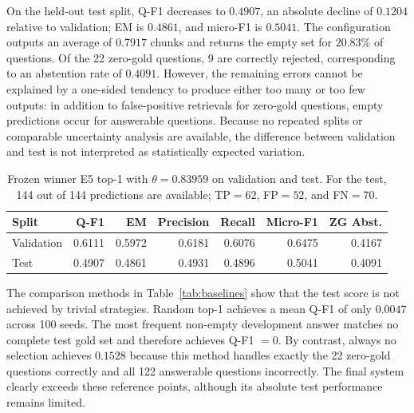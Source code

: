 \documentclass[11pt]{article}
\begin{document}
On the held-out test split, Q-F1 decreases to $0.4907$, an absolute decline of $0.1204$ relative to validation; EM is $0.4861$, and micro-F1 is $0.5041$. The configuration outputs an average of $0.7917$ chunks and returns the empty set for $20.83\%$ of questions. Of the 22 zero-gold questions, 9 are correctly rejected, corresponding to an abstention rate of $0.4091$. However, the remaining errors cannot be explained by a one-sided tendency to produce either too many or too few outputs: in addition to false-positive retrievals for zero-gold questions, empty predictions occur for answerable questions. Because no repeated splits or comparable uncertainty analysis are available, the difference between validation and test is not interpreted as statistically expected variation.

\begin{table}[t]
\centering
\small
\begin{tabular}{lrrrrrr}
\toprule
\textbf{Split} & \textbf{Q-F1} & \textbf{EM} & \textbf{Precision} & \textbf{Recall} & \textbf{Micro-F1} & \textbf{ZG Abst.} \\
\midrule
Validation & 0.6111 & 0.5972 & 0.6181 & 0.6076 & 0.6475 & 0.4167 \\
Test         & 0.4907 & 0.4861 & 0.4931 & 0.4896 & 0.5041 & 0.4091 \\
\bottomrule
\end{tabular}
\caption{Frozen winner E5 top-1 with $\theta=0.83959$ on validation and test. For the test, 144 out of 144 predictions are available; TP${}=62$, FP${}=52$, and FN${}=70$.}
\label{tab:final-system}
\end{table}

The comparison methods in Table~\ref{tab:baselines} show that the test score is not achieved by trivial strategies. Random top-1 achieves a mean Q-F1 of only $0.0047$ across 100 seeds. The most frequent non-empty development answer matches no complete test gold set and therefore achieves Q-F1 $=0$. By contrast, always no selection achieves $0.1528$ because this method handles exactly the 22 zero-gold questions correctly and all 122 answerable questions incorrectly. The final system clearly exceeds these reference points, although its absolute test performance remains limited.
\end{document}
